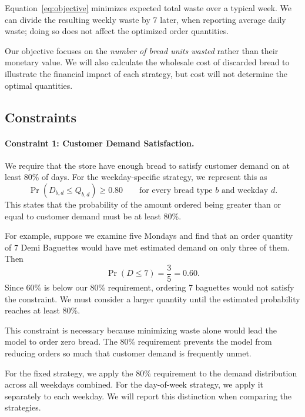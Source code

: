 \documentclass[11pt]{article}
\begin{document}
Equation~\eqref{eq:objective} minimizes expected total waste over a typical week. We can divide the resulting weekly waste by 7 later, when reporting average daily waste; doing so does not affect the optimized order quantities.

Our objective focuses on the \emph{number of bread units wasted} rather than their monetary value. We will also calculate the wholesale cost of discarded bread to illustrate the financial impact of each strategy, but cost will not determine the optimal quantities.

\subsection{Constraints}

\paragraph{Constraint 1: Customer Demand Satisfaction.}
We require that the store have enough bread to satisfy customer demand on at least 80\% of days. For the weekday-specific strategy, we represent this as
\begin{equation}
\boxed{\Pr(D_{b,d}\le Q_{b,d})\ge 0.80\qquad\text{for every bread type }b\text{ and weekday }d.}
\label{eq:service}
\end{equation}
This states that the probability of the amount ordered being greater than or equal to customer demand must be at least 80\%.

For example, suppose we examine five Mondays and find that an order quantity of 7 Demi Baguettes would have met estimated demand on only three of them. Then
\begin{equation}
\Pr(D\le 7)=\frac{3}{5}=0.60.
\end{equation}
Since 60\% is below our 80\% requirement, ordering 7 baguettes would not satisfy the constraint. We must consider a larger quantity until the estimated probability reaches at least 80\%.

This constraint is necessary because minimizing waste alone would lead the model to order zero bread. The 80\% requirement prevents the model from reducing orders so much that customer demand is frequently unmet.

For the fixed strategy, we apply the 80\% requirement to the demand distribution across all weekdays combined. For the day-of-week strategy, we apply it separately to each weekday. We will report this distinction when comparing the strategies.
\end{document}
